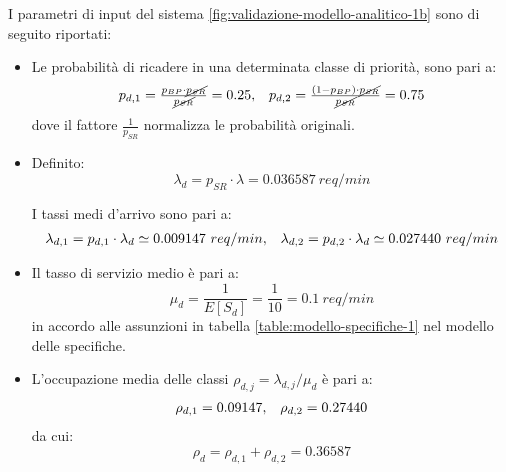 I parametri di input del sistema \ref{fig:validazione-modello-analitico-1b} sono di seguito riportati:
\begin{itemize}
\item Le probabilità di ricadere in una determinata classe di priorità, sono pari a:
\begin{equation}
\begin{array}{l l}
p_{d,1} = \frac{p_{BP} \cdot \cancel{p_{SR}}}{\cancel{p_{SR}}} = 0.25, & p_{d,2} = \frac{(1-p_{BP}) \cdot \cancel{p_{SR}}}{\cancel{p_{SR}}} = 0.75
\end{array}
\end{equation}
dove il fattore $\frac{1}{p_{SR}}$ normalizza le probabilità originali.

\item Definito:
\begin{equation}
\lambda_d = p_{SR}\cdot \lambda = 0.036587\ req/min
\end{equation} 

I tassi medi d'arrivo sono pari a:
\begin{equation}
\begin{array}{l l}
\lambda_{d,1} = p_{d,1} \cdot \lambda_d \simeq 0.009147\ req/min, & \lambda_{d,2} = p_{d,2} \cdot \lambda_d \simeq 0.027440\ req/min
\end{array}
\end{equation}

\item Il tasso di servizio medio è pari a:
\begin{equation}
\mu_d = \frac{1}{E[S_d]} = \frac{1}{10} = 0.1\ req/min
\end{equation}
in accordo alle assunzioni in tabella \ref{table:modello-specifiche-1} nel modello delle specifiche.

\item L'occupazione media delle classi $\rho_{d,j} = \lambda_{d,j}/\mu_d$ è pari a:
\begin{equation}
\begin{array}{l l}
\rho_{d,1} = 0.09147, & \rho_{d,2} = 0.27440
\end{array}
\end{equation}
da cui:
\begin{equation}
\rho_d = \rho_{d,1} + \rho_{d,2} = 0.36587
\end{equation}
\end{itemize}

